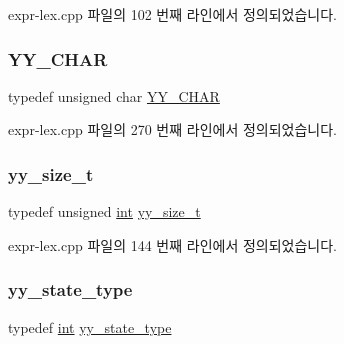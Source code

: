 expr-\/lex.\+cpp 파일의 102 번째 라인에서 정의되었습니다.

\mbox{\label{expr-lex_8cpp_a1f324b3cb0839eeb90145f0274e6946e}} 
\subsubsection{\texorpdfstring{Y\+Y\+\_\+\+C\+H\+AR}{YY\_CHAR}}
{\footnotesize\ttfamily typedef unsigned char \mbox{\hyperlink{expr-lex_8cpp_a1f324b3cb0839eeb90145f0274e6946e}{Y\+Y\+\_\+\+C\+H\+AR}}}



expr-\/lex.\+cpp 파일의 270 번째 라인에서 정의되었습니다.

\mbox{\label{expr-lex_8cpp_aa14cc3d400000eef0cd40225fd790cfe}} 
\subsubsection{\texorpdfstring{yy\+\_\+size\+\_\+t}{yy\_size\_t}}
{\footnotesize\ttfamily typedef unsigned \mbox{\hyperlink{_util_8cpp_a0ef32aa8672df19503a49fab2d0c8071}{int}} \mbox{\hyperlink{expr-lex_8cpp_aa14cc3d400000eef0cd40225fd790cfe}{yy\+\_\+size\+\_\+t}}}



expr-\/lex.\+cpp 파일의 144 번째 라인에서 정의되었습니다.

\mbox{\label{expr-lex_8cpp_a9ba7c416f135b0f0c1f4addded4616b5}} 
\subsubsection{\texorpdfstring{yy\+\_\+state\+\_\+type}{yy\_state\_type}}
{\footnotesize\ttfamily typedef \mbox{\hyperlink{_util_8cpp_a0ef32aa8672df19503a49fab2d0c8071}{int}} \mbox{\hyperlink{expr-lex_8cpp_a9ba7c416f135b0f0c1f4addded4616b5}{yy\+\_\+state\+\_\+type}}}



